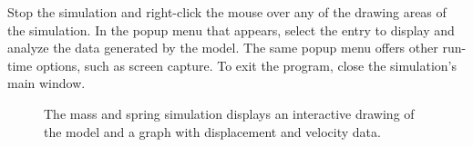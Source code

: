 Stop the simulation and right-click the mouse over any of the drawing areas of the simulation. In the popup menu that appears, select the  entry to display and analyze the data generated by the model.  The same popup menu offers other run-time options, such as screen capture.  To exit the program, close the simulation's main window.

\begin{figure}[htb]
  \centering
  \caption{The mass and spring simulation displays an interactive drawing of the model and a graph with displacement and velocity data.}
  \label{fig:02ExplorationJava/SpringRunning}
\end{figure}


